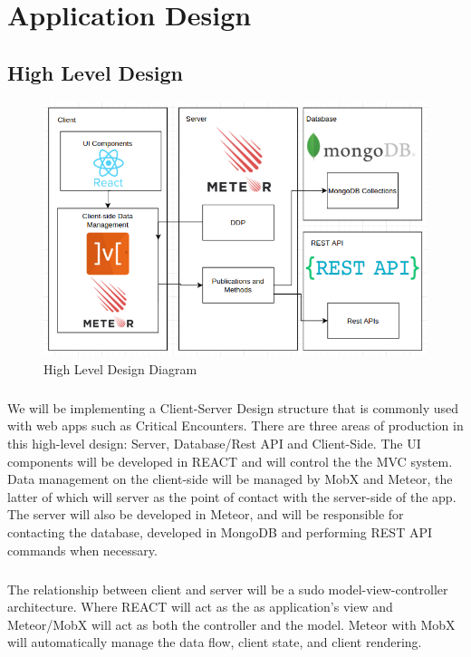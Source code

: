 \documentclass[12pt,a4paper]{report}
\begin{document}
\newpage
\chapter*{Application Design}
	\section {High Level Design}
		\begin{figure}[h]
			\includegraphics[scale=.5]{designsd.png}
			\caption{High Level Design Diagram}
			\label{fig: High Level Design}
		\end{figure}
		
		\paragraph{}We will be implementing a Client-Server Design structure that is commonly used with web apps such as Critical Encounters. There are three areas of production in this high-level design: Server, Database/Rest API and Client-Side. The UI components will be developed in REACT and will control the the MVC system. Data management on the client-side will be managed by MobX and Meteor, the latter of which will server as the point of contact with the server-side of the app. The server will also be developed in Meteor, and will be responsible for contacting the database, developed in MongoDB and performing REST API commands when necessary. 
		
		\paragraph {} The relationship between client and server will be a sudo model-view-controller architecture. Where REACT will act as the as application's view and Meteor/MobX will act as both the controller and the model. Meteor with MobX will automatically manage the data flow, client state, and client rendering.
	
\end{document}
